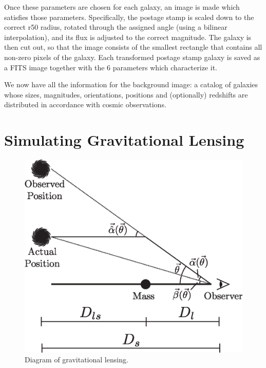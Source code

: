 \documentclass[10pt,twoside]{article}
\theoremstyle{definition}
\theoremstyle{exercise}
\begin{document}
Once these parameters are chosen for each galaxy, an image is made which satisfies those parameters. Specifically, the postage stamp is scaled down to the correct r50 radius, rotated through the assigned angle (using a bilinear interpolation), and its flux is adjusted to the correct magnitude. The galaxy is then cut out, so that the image consists of the smallest rectangle that contains all non-zero pixels of the galaxy. Each transformed postage stamp galaxy is saved as a FITS image together with the 6 parameters which characterize it.

We now have all the information for the background image: a catalog of galaxies whose sizes, magnitudes, orientations, positions and (optionally) redshifts are distributed in accordance with cosmic observations.

\section{Simulating Gravitational Lensing}
\begin{figure}[h]
		\begin{center}
          \includegraphics[scale=0.5]{../images/lensing_formalism.eps}
		\end{center}
		\caption{Diagram of gravitational lensing.}
		\label{fig:lensing_diagram}
\end{figure}
\end{document}
